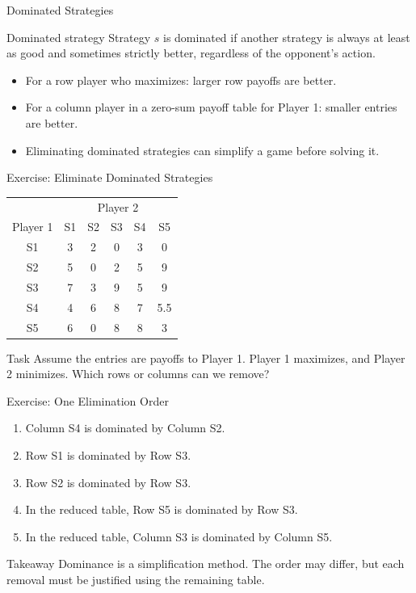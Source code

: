 \documentclass[10pt,aspectratio=169]{beamer}
\begin{document}
\begin{frame}{Dominated Strategies}
\begin{block}{Dominated strategy}
Strategy $s$ is dominated if another strategy is always at least as good and sometimes strictly better, regardless of the opponent's action.
\end{block}
\vspace{0.2cm}
\begin{itemize}
  \item For a row player who maximizes: larger row payoffs are better.
  \item For a column player in a zero-sum payoff table for Player 1: smaller entries are better.
  \item Eliminating dominated strategies can simplify a game before solving it.
\end{itemize}
\end{frame}

\begin{frame}{Exercise: Eliminate Dominated Strategies}
\begin{center}
\begin{tabular}{c c c c c c}
 & \multicolumn{5}{c}{Player 2}\\
Player 1 & S1 & S2 & S3 & S4 & S5\\
\midrule
S1 & 3 & 2 & 0 & 3 & 0\\
S2 & 5 & 0 & 2 & 5 & 9\\
S3 & 7 & 3 & 9 & 5 & 9\\
S4 & 4 & 6 & 8 & 7 & 5.5\\
S5 & 6 & 0 & 8 & 8 & 3\\
\end{tabular}
\end{center}
\vspace{0.2cm}
\begin{block}{Task}
Assume the entries are payoffs to Player 1. Player 1 maximizes, and Player 2 minimizes. Which rows or columns can we remove?
\end{block}
\end{frame}

\begin{frame}{Exercise: One Elimination Order}
\begin{enumerate}
  \item Column S4 is dominated by Column S2.
  \item Row S1 is dominated by Row S3.
  \item Row S2 is dominated by Row S3.
  \item In the reduced table, Row S5 is dominated by Row S3.
  \item In the reduced table, Column S3 is dominated by Column S5.
\end{enumerate}
\vspace{0.2cm}
\begin{block}{Takeaway}
Dominance is a simplification method. The order may differ, but each removal must be justified using the remaining table.
\end{block}
\end{frame}
\end{document}
